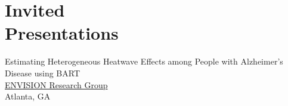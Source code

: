 \section{Invited \\ Presentations}

Estimating Heterogeneous Heatwave Effects among People with Alzheimer's \\ Disease using BART \hfill {} \\
    \indent \quad \href{https://scholarblogs.emory.edu/envision/}{ENVISION Research Group}  \\
    \indent \quad Atlanta, GA
